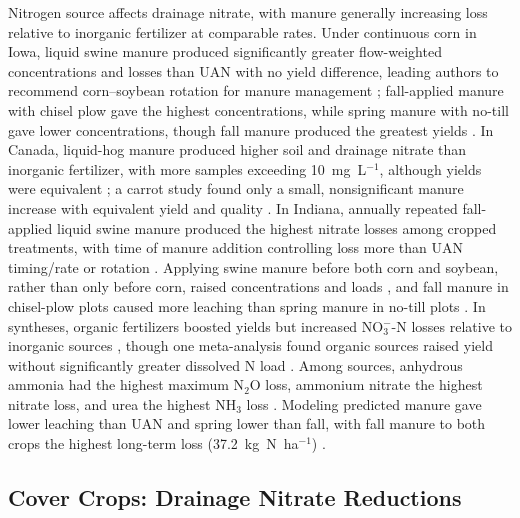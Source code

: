 \documentclass[11pt]{article}
\begin{document}
Nitrogen source affects drainage nitrate, with manure generally increasing loss relative to inorganic fertilizer at comparable rates. Under continuous corn in Iowa, liquid swine manure produced significantly greater flow-weighted concentrations and losses than UAN with no yield difference, leading authors to recommend corn--soybean rotation for manure management \parencite{Bakhsh2005}; fall-applied manure with chisel plow gave the highest concentrations, while spring manure with no-till gave lower concentrations, though fall manure produced the greatest yields \parencite{Bakhsh2007}. In Canada, liquid-hog manure produced higher soil and drainage nitrate than inorganic fertilizer, with more samples exceeding 10~mg~L$^{-1}$, although yields were equivalent \parencite{Elmi2005}; a carrot study found only a small, nonsignificant manure increase with equivalent yield and quality \parencite{Gordon2005}. In Indiana, annually repeated fall-applied liquid swine manure produced the highest nitrate losses among cropped treatments, with time of manure addition controlling loss more than UAN timing/rate or rotation \parencite{HernandezRamirez2011}. Applying swine manure before both corn and soybean, rather than only before corn, raised concentrations and loads \parencite{Dougherty2020}, and fall manure in chisel-plow plots caused more leaching than spring manure in no-till plots \parencite{Rekha2011}. In syntheses, organic fertilizers boosted yields but increased NO$_3^-$-N losses relative to inorganic sources \parencite{Liu2021}, though one meta-analysis found organic sources raised yield without significantly greater dissolved N load \parencite{Christianson2015b}. Among sources, anhydrous ammonia had the highest maximum N$_2$O loss, ammonium nitrate the highest nitrate loss, and urea the highest NH$_3$ loss \parencite{Chatterjee2020b}. Modeling predicted manure gave lower leaching than UAN and spring lower than fall, with fall manure to both crops the highest long-term loss (37.2~kg~N~ha$^{-1}$) \parencite{Malone2007,Malone2007b}.

\subsection{Cover Crops: Drainage Nitrate Reductions}
\end{document}

